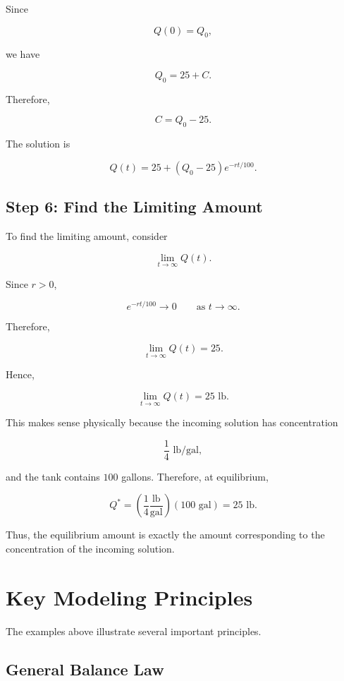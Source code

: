 \documentclass[11pt]{article}
\begin{document}
Since

\[
Q(0)=Q_0,
\]

we have

\[
Q_0=25+C.
\]

Therefore,

\[
C=Q_0-25.
\]

The solution is

\[
\boxed{
Q(t)
=
25+(Q_0-25)e^{-rt/100}.
}
\]

\subsection{Step 6: Find the Limiting Amount}

To find the limiting amount, consider

\[
\lim_{t\to\infty}Q(t).
\]

Since \(r>0\),

\[
e^{-rt/100}\to0
\qquad\text{as }t\to\infty.
\]

Therefore,

\[
\lim_{t\to\infty}Q(t)
=
25.
\]

Hence,

\[
\boxed{
\lim_{t\to\infty}Q(t)=25\text{ lb}.
}
\]

This makes sense physically because the incoming solution has
concentration

\[
\frac14\text{ lb/gal},
\]

and the tank contains \(100\) gallons. Therefore, at equilibrium,

\[
Q^*
=
\left(
\frac14\frac{\text{lb}}{\text{gal}}
\right)
(100\text{ gal})
=
25\text{ lb}.
\]

Thus, the equilibrium amount is exactly the amount corresponding
to the concentration of the incoming solution.

\section{Key Modeling Principles}

The examples above illustrate several important principles.

\subsection{General Balance Law}
\end{document}
